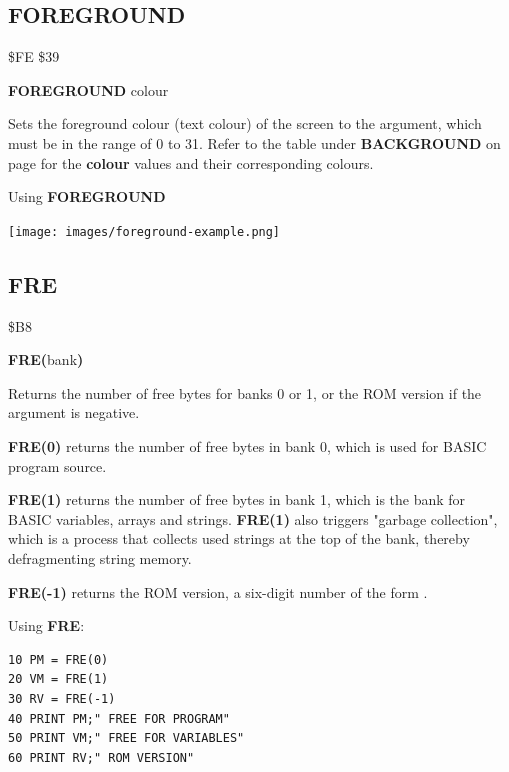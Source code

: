 \newpage
\subsection{FOREGROUND}
\begin{description}[leftmargin=2cm,style=nextline]
\item [Token:] \$FE \$39
\item [Format:] {\bf FOREGROUND} colour
\item [Usage:] Sets the foreground colour
               (text colour) of the screen to the argument,
               which must be in the
               range of 0 to 31.
               Refer to the table under
               {\bf BACKGROUND} on page \pageref{colourtable}
               for the {\bf colour} values and their corresponding colours.

\item [Example:] Using {\bf FOREGROUND}
\item \begin{center}\texttt{[image: images/foreground-example.png]}\end{center}
\end{description}


\newpage
\subsection{FRE}
\begin{description}[leftmargin=2cm,style=nextline]
\item [Token:] \$B8
\item [Format:] {\bf FRE(}bank{\bf)}
\item [Usage:] Returns the number of free bytes for banks 0 or 1,
               or the ROM version if the argument is negative.

               {\bf FRE(0)} returns the number of free bytes in
               bank 0, which is used for BASIC program source.

               {\bf FRE(1)} returns the number of free bytes in
               bank 1, which is the bank for BASIC variables, arrays
               and strings. {\bf FRE(1)} also triggers
               "garbage collection", which is a process that collects
               used strings at the top of the bank, thereby
               defragmenting string memory.

               {\bf FRE(-1)} returns the ROM version, a six-digit number
               of the form .

\item [Example:] Using {\bf FRE}:
\begin{tcolorbox}[colback=black,coltext=white]
\verbatimfont{\codefont}
\begin{verbatim}
10 PM = FRE(0)
20 VM = FRE(1)
30 RV = FRE(-1)
40 PRINT PM;" FREE FOR PROGRAM"
50 PRINT VM;" FREE FOR VARIABLES"
60 PRINT RV;" ROM VERSION"
\end{verbatim}
\end{tcolorbox}
\end{description}

